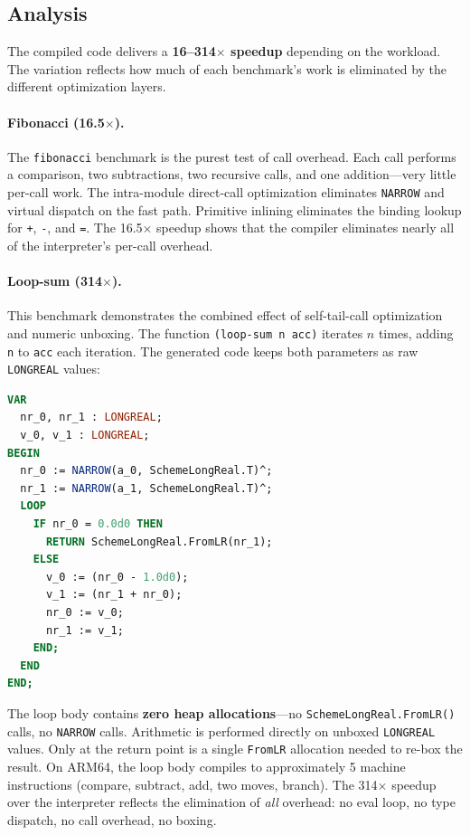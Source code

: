 \documentclass[12pt]{report}
\begin{document}
\subsection{Analysis}

The compiled code delivers a \textbf{16--314$\times$ speedup}
depending on the workload.  The variation reflects how much of each
benchmark's work is eliminated by the different optimization layers.

\paragraph{Fibonacci (16.5$\times$).}
The \texttt{fibonacci} benchmark is the purest test of call
overhead.  Each call performs a comparison, two subtractions, two
recursive calls, and one addition---very little per-call work.
The intra-module direct-call optimization eliminates
\texttt{NARROW} and virtual dispatch on the fast path.  Primitive
inlining eliminates the binding lookup for \texttt{+}, \texttt{-},
and \texttt{=}.  The 16.5$\times$ speedup shows that the compiler
eliminates nearly all of the interpreter's per-call overhead.

\paragraph{Loop-sum (314$\times$).}
This benchmark demonstrates the combined effect of self-tail-call
optimization and numeric unboxing.  The function
\texttt{(loop-sum n acc)} iterates $n$ times, adding \texttt{n}
to \texttt{acc} each iteration.  The generated code keeps both
parameters as raw \texttt{LONGREAL} values:

\begin{lstlisting}[language=Modula3]
VAR
  nr_0, nr_1 : LONGREAL;
  v_0, v_1 : LONGREAL;
BEGIN
  nr_0 := NARROW(a_0, SchemeLongReal.T)^;
  nr_1 := NARROW(a_1, SchemeLongReal.T)^;
  LOOP
    IF nr_0 = 0.0d0 THEN
      RETURN SchemeLongReal.FromLR(nr_1);
    ELSE
      v_0 := (nr_0 - 1.0d0);
      v_1 := (nr_1 + nr_0);
      nr_0 := v_0;
      nr_1 := v_1;
    END;
  END
END;
\end{lstlisting}

\noindent
The loop body contains \textbf{zero heap allocations}---no
\texttt{SchemeLongReal.FromLR()} calls, no \texttt{NARROW} calls.
Arithmetic is performed directly on unboxed \texttt{LONGREAL} values.
Only at the return point is a single \texttt{FromLR} allocation
needed to re-box the result.  On ARM64, the loop body compiles to
approximately 5 machine instructions (compare, subtract, add,
two moves, branch).  The 314$\times$ speedup over the interpreter
reflects the elimination of \emph{all} overhead: no eval loop, no
type dispatch, no call overhead, no boxing.
\end{document}
